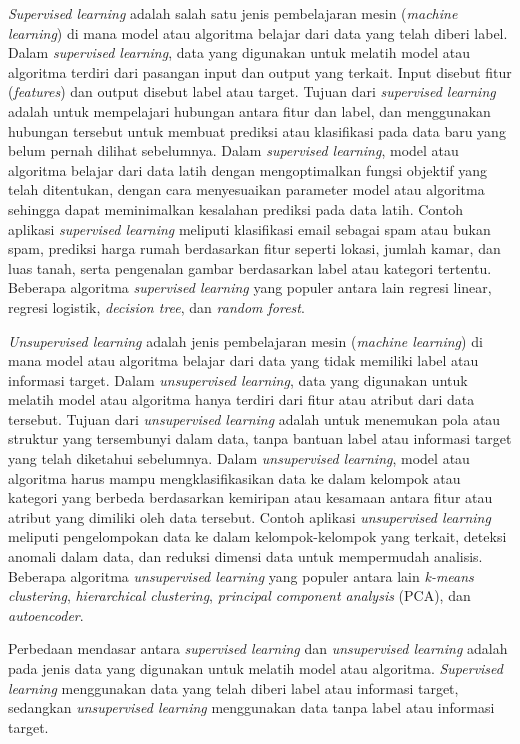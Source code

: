 \textit{Supervised learning} adalah salah satu jenis pembelajaran mesin (\textit{machine learning}) di mana model atau algoritma belajar dari data yang telah diberi label. Dalam \textit{supervised learning}, data yang digunakan untuk melatih model atau algoritma terdiri dari pasangan input dan output yang terkait. Input disebut fitur (\textit{features}) dan output disebut label atau target. Tujuan dari \textit{supervised learning} adalah untuk mempelajari hubungan antara fitur dan label, dan menggunakan hubungan tersebut untuk membuat prediksi atau klasifikasi pada data baru yang belum pernah dilihat sebelumnya. Dalam \textit{supervised learning}, model atau algoritma belajar dari data latih dengan mengoptimalkan fungsi objektif yang telah ditentukan, dengan cara menyesuaikan parameter model atau algoritma sehingga dapat meminimalkan kesalahan prediksi pada data latih. Contoh aplikasi \textit{supervised learning} meliputi klasifikasi email sebagai spam atau bukan spam, prediksi harga rumah berdasarkan fitur seperti lokasi, jumlah kamar, dan luas tanah, serta pengenalan gambar berdasarkan label atau kategori tertentu. Beberapa algoritma \textit{supervised learning} yang populer antara lain regresi linear, regresi logistik, \textit{decision tree}, dan \textit{random forest}. 

\textit{Unsupervised learning} adalah jenis pembelajaran mesin (\textit{machine learning}) di mana model atau algoritma belajar dari data yang tidak memiliki label atau informasi target. Dalam \textit{unsupervised learning}, data yang digunakan untuk melatih model atau algoritma hanya terdiri dari fitur atau atribut dari data tersebut. Tujuan dari \textit{unsupervised learning} adalah untuk menemukan pola atau struktur yang tersembunyi dalam data, tanpa bantuan label atau informasi target yang telah diketahui sebelumnya. Dalam \textit{unsupervised learning}, model atau algoritma harus mampu mengklasifikasikan data ke dalam kelompok atau kategori yang berbeda berdasarkan kemiripan atau kesamaan antara fitur atau atribut yang dimiliki oleh data tersebut. Contoh aplikasi \textit{unsupervised learning} meliputi pengelompokan data ke dalam kelompok-kelompok yang terkait, deteksi anomali dalam data, dan reduksi dimensi data untuk mempermudah analisis. Beberapa algoritma \textit{unsupervised learning} yang populer antara lain \textit{k-means clustering}, \textit{hierarchical clustering}, \textit{principal component analysis} (PCA), dan \textit{autoencoder}.

Perbedaan mendasar antara \textit{supervised learning} dan \textit{unsupervised learning} adalah pada jenis data yang digunakan untuk melatih model atau algoritma. \textit{Supervised learning} menggunakan data yang telah diberi label atau informasi target, sedangkan \textit{unsupervised learning} menggunakan data tanpa label atau informasi target.

